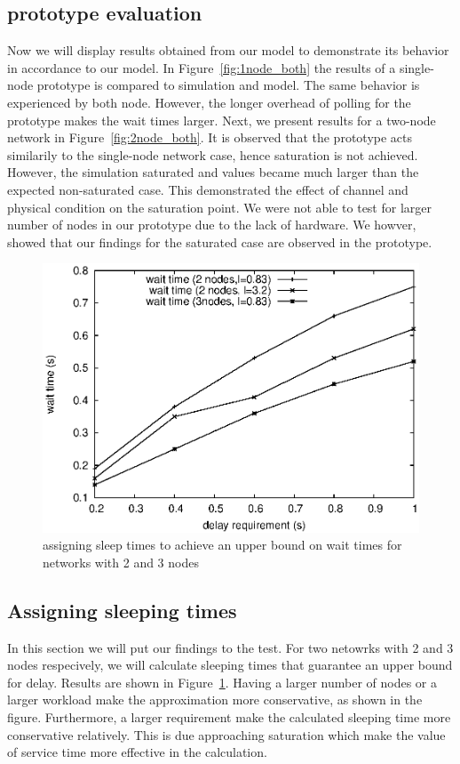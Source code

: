 \subsection{prototype evaluation}
Now we will display results obtained from our model to demonstrate its behavior in accordance to our model. In Figure~\ref{fig:1node_both} the results of a single-node prototype is compared to simulation and model. The same behavior is experienced by both node. However, the longer overhead of polling for the prototype makes the wait times larger. Next, we present results for a two-node network in Figure~\ref{fig:2node_both}. It is observed that the prototype acts similarily to the single-node network case, hence saturation is not achieved. However, the simulation saturated and values became much larger than the expected non-saturated case. This demonstrated the effect of channel and physical condition on the saturation point. We were not able to test for larger number of nodes in our prototype due to the lack of hardware. We howver, showed that our findings for the saturated case are observed in the prototype.

\begin{figure}[t]
\centering
\includegraphics[scale=0.65]{figures/test_2nodes.eps}
\caption{assigning sleep times to achieve an upper bound on wait times for networks with 2 and 3 nodes}
\label{fig:test_2nodes}
\end{figure}

\subsection{Assigning sleeping times}
In this section we will put our findings to the test. For two netowrks with 2 and 3 nodes respecively, we will calculate sleeping times that guarantee an upper bound for delay. Results are shown in Figure~\ref{fig:test_2nodes}. Having a larger number of nodes or a larger workload make the approximation more conservative, as shown in the figure. Furthermore, a larger requirement make the calculated sleeping time more conservative relatively. This is due approaching saturation which make the value of service time more effective in the calculation.



